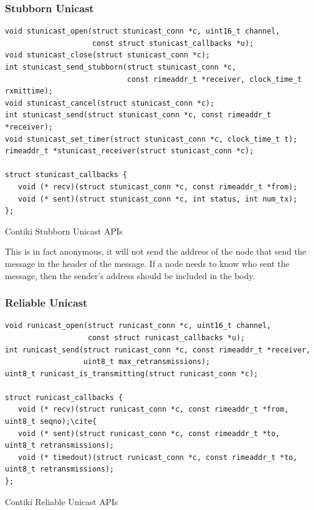 \subsubsection{Stubborn Unicast}

\begin{listing}[H]
\begin{verbatim}
void stunicast_open(struct stunicast_conn *c, uint16_t channel,
                    const struct stunicast_callbacks *u);
void stunicast_close(struct stunicast_conn *c);
int stunicast_send_stubborn(struct stunicast_conn *c,
                            const rimeaddr_t *receiver, clock_time_t rxmittime);
void stunicast_cancel(struct stunicast_conn *c);
int stunicast_send(struct stunicast_conn *c, const rimeaddr_t *receiver);
void stunicast_set_timer(struct stunicast_conn *c, clock_time_t t);
rimeaddr_t *stunicast_receiver(struct stunicast_conn *c);

struct stunicast_callbacks {
   void (* recv)(struct stunicast_conn *c, const rimeaddr_t *from);
   void (* sent)(struct stunicast_conn *c, int status, int num_tx);
};
\end{verbatim}
\caption{Contiki Stubborn Unicast APIs}
\end{listing}

This is in fact anonymous, it will not send the address of the node that send the message in the header of the message. If a node needs to know who sent the message, then the sender's address should be included in the body.


\subsubsection{Reliable Unicast}

\begin{listing}[H]
\begin{verbatim}
void runicast_open(struct runicast_conn *c, uint16_t channel,
                   const struct runicast_callbacks *u);
int runicast_send(struct runicast_conn *c, const rimeaddr_t *receiver,
                  uint8_t max_retransmissions);
uint8_t runicast_is_transmitting(struct runicast_conn *c);

struct runicast_callbacks {
   void (* recv)(struct runicast_conn *c, const rimeaddr_t *from, uint8_t seqno);\cite{
   void (* sent)(struct runicast_conn *c, const rimeaddr_t *to, uint8_t retransmissions);
   void (* timedout)(struct runicast_conn *c, const rimeaddr_t *to, uint8_t retransmissions);
};
\end{verbatim}
\caption{Contiki Reliable Unicast APIs}
\end{listing}

